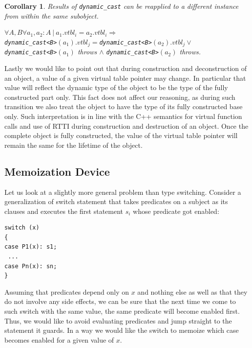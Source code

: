 \documentclass[preprint]{sigplanconf}
\makeatletter
\DeclareRobustCommand{\code}[1]{{\lstinline[breaklines=false,escapechar=@]{#1}}}
\newtheorem{corollary}{Corollary}
\makeatother
\begin{document}
\begin{corollary}
Results of \code{dynamic_cast} can be reapplied to a different instance from 
within the same subobject. 

$\forall A,B \forall a_1, a_2 : A\ |\ a_1.vtbl_i = a_2.vtbl_i \Rightarrow$ \\
\code{dynamic_cast<B>}$(a_1).vtbl_j = $\code{dynamic_cast<B>}$(a_2).vtbl_j \vee$ \\
\code{dynamic_cast<B>}$(a_1)$ throws $\wedge$ \code{dynamic_cast<B>}$(a_2)$ throws.
\label{crl:vtbl}
\end{corollary}

Lastly we would like to point out that during construction and deconstruction of 
an object, a value of a given virtual table pointer may change. In particular 
that value will reflect the dynamic type of the object to be the type of the 
fully constructed part only. This fact does not affect our reasoning, as during 
such transition we also treat the object to have the type of its fully 
constructed base only. Such interpretation is in line with the C++ semantics for 
virtual function calls and use of RTTI during construction and destruction of an 
object. Once the complete object is fully constructed, the value of the virtual 
table pointer will remain the same for the lifetime of the object.

\subsection{Memoization Device}
\label{sec:memdev}

Let us look at a slightly more general problem than type switching. Consider a 
generalization of switch statement that takes predicates on a subject as its 
clauses and executes the first statement $s_i$ whose predicate got enabled: 

\begin{lstlisting}
switch (x)
{
case P1(x): s1;
 ...
case Pn(x): sn;
}
\end{lstlisting}

\noindent
Assuming that predicates depend only on $x$ and nothing else as well as that 
they do not involve any side effects, we can be sure that the next time we come 
to such switch with the same value, the same predicate will become enabled 
first. Thus, we would like to avoid evaluating predicates and jump straight to 
the statement it guards. In a way we would like the switch to  memoize which 
case becomes enabled for a given value of $x$.
\end{document}
